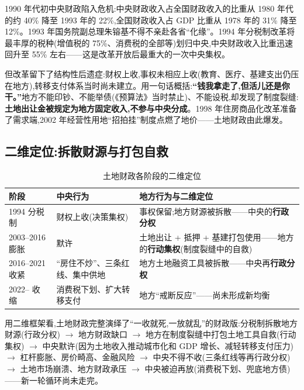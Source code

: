 \documentclass[UTF8,12pt,a4paper]{ctexrep}
\begin{document}
1990 年代初中央财政陷入危机:中央财政收入占全国财政收入的比重从 1980 年代的约 40\% 降至 1993 年的 22\%,全国财政收入占 GDP 比重从 1978 年的 31\% 降至 12\%。1993 年国务院副总理朱镕基不得不亲赴各省``化缘''。1994 年分税制改革将最丰厚的税种(增值税的 75\%、消费税的全部等)划归中央,中央财政收入比重迅速回升至 55\% 左右——这是改革开放后最重大的一次中央集权。

但改革留下了结构性后遗症:财权上收,事权未相应上收(教育、医疗、基建支出仍压在地方),转移支付体系当时尚未建立。用一句话概括:\textbf{``钱我拿走了,但活儿还是你干。''}地方不能印钞、不能举债(《预算法》当时禁止)、不能设税,却发现了制度裂缝:\textbf{土地出让金被规定为地方固定收入,不参与中央分成}。1998 年住房商品化改革准备了需求端,2002 年经营性用地``招拍挂''制度点燃了地价——土地财政由此爆发。

\subsection{二维定位:拆散财源与打包自救}

\begin{table}[htbp]
  \centering
  \small
  \caption{土地财政各阶段的二维定位}
  \label{tab:land-matrix}
  \begin{tabularx}{\linewidth}{@{}p{2.6cm}XX@{}}
    \toprule
    \textbf{阶段} & \textbf{中央行为} & \textbf{地方行为与二维定位} \\
    \midrule
    1994 分税制 & 财权上收(决策集权) & 事权保留;地方财源被拆散——中央的\textbf{行政分权} \\
    2003--2016 膨胀 & 默许 & 土地出让 + 抵押 + 基建打包使用——地方的\textbf{行动集权}(制度裂缝中的自救) \\
    2016--2021 收紧 & ``房住不炒''、三条红线、集中供地 & 地方土地融资工具被拆散——中央再\textbf{行政分权} \\
    2022-- 收缩 & 消费税下划、扩大转移支付 & 地方``戒断反应''——尚未形成新均衡 \\
    \bottomrule
  \end{tabularx}
\end{table}

用二维框架看,土地财政完整演绎了``一收就死,一放就乱''的财政版:分税制拆散地方财源(行政分权) $\rightarrow$ 地方财政缺口 $\rightarrow$ 地方在制度裂缝中打包土地工具自救(行动集权) $\rightarrow$ 中央默许(因为土地收入推动城市化和 GDP 增长、减轻转移支付压力) $\rightarrow$ 杠杆膨胀、房价畸高、金融风险 $\rightarrow$ 中央不得不收(三条红线等再行政分权) $\rightarrow$ 土地市场崩溃、地方财政承压 $\rightarrow$ 中央被迫再放(消费税下划、兜底地方债)——新一轮循环尚未走完。
\end{document}
